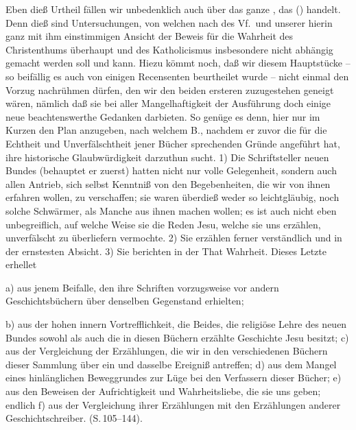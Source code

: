 Eben dieß Urtheil fällen wir unbedenklich auch über das ganze , das  () handelt. Denn dieß sind Untersuchungen, von welchen nach des Vf.\ und unserer hierin ganz mit ihm einstimmigen Ansicht der Beweis für die Wahrheit des Christenthums überhaupt und des Katholicismus insbesondere nicht abhängig gemacht werden soll und kann. Hiezu kömmt noch, daß wir diesem Hauptstücke -- so beifällig es auch von einigen Recensenten beurtheilet wurde -- nicht einmal den Vorzug nachrühmen dürfen, den wir den beiden ersteren zuzugestehen geneigt wären, nämlich daß sie bei aller Mangelhaftigkeit der Ausführung doch einige neue beachtenswerthe Gedanken darbieten. So genüge es denn, hier nur im Kurzen den Plan anzugeben, nach welchem B., nachdem er zuvor die für die Echtheit und Unverfälschtheit jener Bücher sprechenden Gründe angeführt hat, ihre historische Glaubwürdigkeit darzuthun sucht. 1) Die Schriftsteller neuen Bundes (behauptet er zuerst) hatten nicht nur volle Gelegenheit, sondern auch allen Antrieb, sich selbst Kenntniß von den Begebenheiten, die wir von ihnen erfahren wollen, zu verschaffen; sie waren überdieß weder so leichtgläubig, noch solche Schwärmer, als Manche aus  ihnen machen wollen; es ist auch nicht eben unbegreiflich, auf welche Weise sie die Reden Jesu, welche sie uns erzählen, unverfälscht zu überliefern vermochte. 2) Sie erzählen ferner verständlich und in der ernstesten Absicht. 3) Sie berichten in der That Wahrheit. Dieses Letzte erhellet \par
a) aus jenem Beifalle, den ihre Schriften vorzugsweise vor andern Geschichtsbüchern über denselben Gegenstand erhielten; \par
b) aus der hohen innern Vortrefflichkeit, die Beides, die religiöse Lehre des neuen Bundes sowohl als auch die in diesen Büchern erzählte Geschichte Jesu besitzt; c) aus der Vergleichung der Erzählungen, die wir in den verschiedenen Büchern dieser Sammlung über ein und dasselbe Ereigniß antreffen; d) aus dem Mangel eines hinlänglichen Beweggrundes zur Lüge bei den Verfassern dieser Bücher; e) aus den Beweisen der Aufrichtigkeit und Wahrheitsliebe, die sie uns geben; endlich f) aus der Vergleichung ihrer Erzählungen mit den Erzählungen anderer Geschichtschreiber. (S.\,105--144). \par
